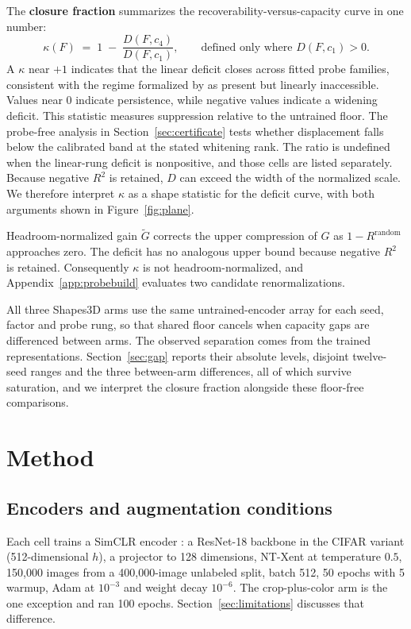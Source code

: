 \documentclass[10pt]{article}
\newcommand{\R}{R}
\newcommand{\G}{G}
\begin{document}
The \textbf{closure fraction} summarizes the recoverability-versus-capacity curve in one number:
\begin{equation}
\kappa(F) \;=\; 1 \;-\; \frac{D(F, c_4)}{D(F, c_1)},
\qquad\text{defined only where } D(F, c_1) > 0.
\label{eq:kappa}
\end{equation}
A $\kappa$ near $+1$ indicates that the linear deficit closes across fitted probe families, consistent
with the regime formalized by \citet{belrose2023leace} as present but linearly inaccessible. Values
near $0$ indicate persistence, while negative values indicate a widening deficit. This statistic
measures suppression relative to the untrained floor. The probe-free analysis in
Section~\ref{sec:certificate} tests whether displacement falls below the calibrated band at the
stated whitening rank. The ratio is undefined
when the linear-rung deficit is nonpositive, and those cells are listed separately. Because negative
$R^2$ is retained, $D$ can exceed the width of the normalized scale. We therefore interpret
$\kappa$ as a shape statistic for the deficit curve, with both arguments shown in
Figure~\ref{fig:plane}.

Headroom-normalized gain $\tilde{\G}$ corrects the upper compression of $\G$ as $1 -
\R^{\mathrm{random}}$ approaches zero. The deficit has no analogous upper bound because
negative $R^2$ is retained. Consequently $\kappa$ is not headroom-normalized, and
Appendix~\ref{app:probebuild} evaluates two candidate renormalizations.

All three Shapes3D arms use the same untrained-encoder array for each seed, factor and probe rung,
so that shared floor cancels when capacity gaps are differenced between arms. The observed
separation comes from the trained representations. Section~\ref{sec:gap} reports their absolute
levels, disjoint twelve-seed ranges and the three between-arm differences, all of which survive
saturation, and we interpret the closure fraction alongside these floor-free comparisons.

\section{Method}
\label{sec:method}

\subsection{Encoders and augmentation conditions}
Each cell trains a SimCLR encoder \citep{chen2020simple}: a ResNet-18 backbone in the CIFAR variant
(512-dimensional $h$), a projector to 128 dimensions, NT-Xent at temperature $0.5$, 150{,}000 images
from a 400{,}000-image unlabeled split, batch 512, 50 epochs with 5 warmup, Adam at $10^{-3}$ and
weight decay $10^{-6}$.
The crop-plus-color arm is the one exception and ran 100 epochs.
Section~\ref{sec:limitations} discusses that difference.
\end{document}
